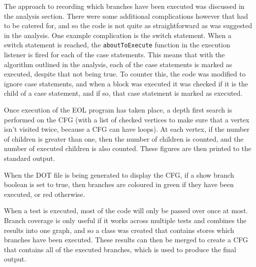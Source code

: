 The approach to recording which branches have been executed was discussed in the analysis section. There were some additional complications however that had to be catered for, and so the code is not quite as straightforward as was suggested in the analysis. One example complication is the switch statement. When a switch statement is reached, the \verb|aboutToExecute| function in the execution listener is fired for each of the case statements. This means that with the algorithm outlined in the analysis, each of the case statements is marked as executed, despite that not being true. To counter this, the code was modified to ignore case statements, and when a block was executed it was checked if it is the child of a case statement, and if so, that case statement is marked as executed.

Once execution of the EOL program has taken place, a depth first search is performed on the CFG (with a list of checked vertices to make sure that a vertex isn't visited twice, because a CFG can have loops). At each vertex, if the number of children is greater than one, then the number of children is counted, and the number of executed children is also counted. These figures are then printed to the standard output.

When the DOT file is being generated to display the CFG, if a show branch boolean is set to true, then branches are coloured in green if they have been executed, or red otherwise.

When a test is executed, most of the code will only be passed over once at most. Branch coverage is only useful if it works across multiple tests and combines the results into one graph, and so a class was created that contains stores which branches have been executed. These results can then be merged to create a CFG that contains all of the executed branches, which is used to produce the final output.
